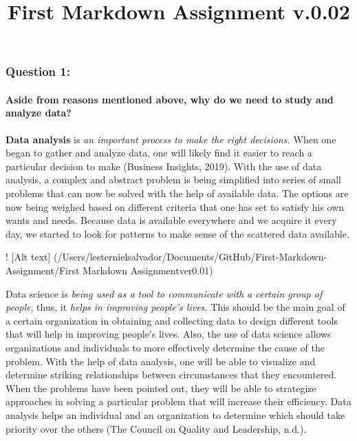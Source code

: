 \documentclass[
]{article}
\title{First Markdown Assignment v.0.02}
\author{}
\date{\vspace{-2.5em}}
\begin{document}
\maketitle

\hypertarget{question-1}{%
\subsubsection{\texorpdfstring{\textbf{Question
1:}}{Question 1:}}\label{question-1}}

\hypertarget{aside-from-reasons-mentioned-above-why-do-we-need-to-study-and-analyze-data}{%
\paragraph{Aside from reasons mentioned above, why do we need to study
and analyze
data?}\label{aside-from-reasons-mentioned-above-why-do-we-need-to-study-and-analyze-data}}

\textbf{Data analysis} is \emph{an important process to make the right
decisions.} When one began to gather and analyze data, one will likely
find it easier to reach a particular decision to make (Business
Insights, 2019). With the use of data analysis, a complex and abstract
problem is being simplified into series of small problems that can now
be solved with the help of available data. The options are now being
weighed based on different criteria that one has set to satisfy his own
wants and needs. Because data is available everywhere and we acquire it
every day, we started to look for patterns to make sense of the
scattered data available.

! {[}Alt text{]}
(/Users/lesternielsalvador/Documents/GitHub/First-Markdown-Assignment/First
Markdown Assignmentver0.01)

Data science is \emph{being used as a tool to communicate with a certain
group of people}, thus, it \emph{helps in improving people's lives.}
This should be the main goal of a certain organization in obtaining and
collecting data to design different tools that will help in improving
people's lives. Also, the use of data science allows organizations and
individuals to more effectively determine the cause of the problem. With
the help of data analysis, one will be able to visualize and determine
striking relationships between circumstances that they encountered. When
the problems have been pointed out, they will be able to strategize
approaches in solving a particular problem that will increase their
efficiency. Data analysis helps an individual and an organization to
determine which should take priority over the others (The Council on
Quality and Leadership, n.d.).
\end{document}
